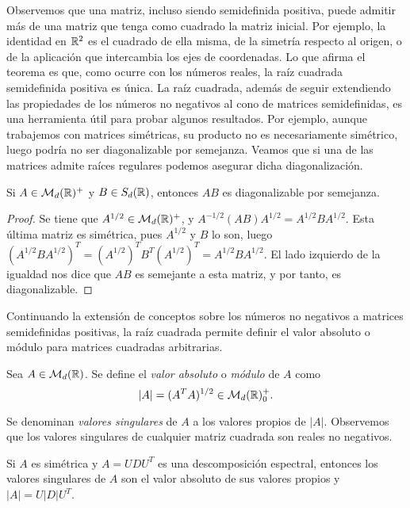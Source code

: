 Observemos que una matriz, incluso siendo semidefinida positiva, puede admitir más de una matriz que tenga como cuadrado la matriz inicial. Por ejemplo, la identidad en $\mathbb{R}^2$ es el cuadrado de ella misma, de la simetría respecto al origen, o de la aplicación que intercambia los ejes de coordenadas. Lo que afirma el teorema es que, como ocurre con los números reales, la raíz cuadrada semidefinida positiva es única. La raíz cuadrada, además de seguir extendiendo las propiedades de los números no negativos al cono de matrices semidefinidas, es una herramienta útil para probar algunos resultados. Por ejemplo, aunque trabajemos con matrices simétricas, su producto no es necesariamente simétrico, luego podría no ser diagonalizable por semejanza. Veamos que si una de las matrices admite raíces regulares podemos asegurar dicha diagonalización.

\begin{cor}
    Si $A \in \mathcal{M}_d(\mathbb{R})^+$ y $B \in S_d(\mathbb{R})$, entonces $AB$ es diagonalizable por semejanza.
\end{cor}

\begin{proof}
    Se tiene que $A^{1/2} \in \mathcal{M}_d(\mathbb{R})^+$, y $A^{-1/2}(AB)A^{1/2} = A^{1/2}BA^{1/2}$. Esta última matriz es simétrica, pues $A^{1/2}$ y $B$ lo son, luego $(A^{1/2}BA^{1/2})^T = (A^{1/2})^TB^T(A^{1/2})^T = A^{1/2}BA^{1/2}$. El lado izquierdo de la igualdad nos dice que $AB$ es semejante a esta matriz, y por tanto, es diagonalizable.
\end{proof}

Continuando la extensión de conceptos sobre los números no negativos a matrices semidefinidas positivas, la raíz cuadrada permite definir el valor absoluto o módulo para matrices cuadradas arbitrarias.

\begin{definition}
    Sea $A \in \mathcal{M}_d(\mathbb{R})$. Se define el \emph{valor absoluto} o \emph{módulo} de $A$ como
    \[ |A| = (A^TA)^{1/2} \in \mathcal{M}_d(\mathbb{R})^+_0. \]

    Se denominan \emph{valores singulares} de $A$ a los valores propios de $|A|$. Observemos que los valores singulares de cualquier matriz cuadrada son reales no negativos.
\end{definition}

\begin{remark}
    Si $A$ es simétrica y $A = UDU^T$ es una descomposición espectral, entonces los valores singulares de $A$ son el valor absoluto de sus valores propios y $|A| = U|D|U^T$.
\end{remark}

